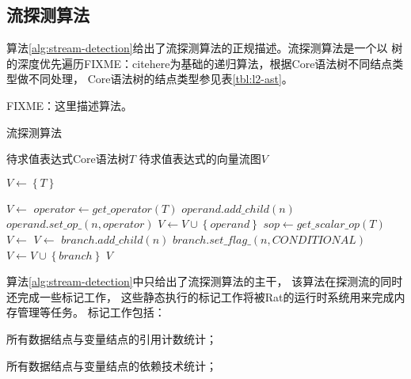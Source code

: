 \subsection{流探测算法}\label{subsec:stream-detection-algorithm}
算法\ref{alg:stream-detection}给出了流探测算法的正规描述。流探测算法是一个以
树的深度优先遍历FIXME：citehere为基础的递归算法，根据Core语法树不同结点类型做不同处理，
Core语法树的结点类型参见表\ref{tbl:l2-ast}。

FIXME：这里描述算法。
\begin{algorithm}[htbp]
  \caption{流探测算法}
  \label{alg:stream-detection}
  \begin{algorithmic}[1]
    \Require 待求值表达式Core语法树$T$
    \Ensure 待求值表达式的向量流图$V$

      \State $V \leftarrow \left\{ T \right\}$
      \State \Return {}
    \EndFunction

      \State $V \leftarrow$ 
      \State $operator \leftarrow get\_operator(T)$ %
       {
        \State $operand.add\_child(n)$
        \State $operand.set\_op\_(n, operator)$
        \State $V \leftarrow V \cup \left\{ operand \right\}$
        \EndIf
      }
      \EndFor
      \EndIf
      \State $sop \leftarrow get\_scalar\_op(T)$
      \State $V \leftarrow$ 
      \EndIf
      \State $V \leftarrow$ 
       {
        \State $branch.add\_child(n)$
        \State $branch.set\_flag\_(n, CONDITIONAL)$
        \State $V \leftarrow V \cup \left\{ branch \right\}$
        \EndIf
      }
      \EndFor
      \EndIf
      \State \Return $V$
    \EndFunction
  \end{algorithmic}
\end{algorithm}

算法\ref{alg:stream-detection}中只给出了流探测算法的主干，
该算法在探测流的同时还完成一些标记工作，
这些静态执行的标记工作将被Rat的运行时系统用来完成内存管理等任务。
标记工作包括：
\begin{compactitem}
  \item 所有数据结点与变量结点的引用计数统计；
  \item 所有数据结点与变量结点的依赖技术统计；
\end{compactitem}


